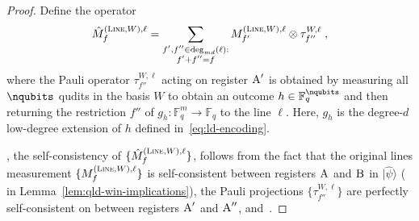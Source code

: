 \documentclass[11pt]{article}
\theoremstyle{definition}
\newcommand{\ket}[1]{|#1\rangle}
\newcommand{\F}{\ensuremath{\mathbb{F}}}
\newcommand{\labelstyle}[1]{\ensuremath{\textsc{#1}}\xspace}
\newcommand{\alice}{\labelstyle{A}}
\newcommand{\bob}{\labelstyle{B}}
\newcommand{\typestyle}[1]{\ensuremath{\textsc{#1}}\xspace}
\renewcommand{\line}{\mathbf{\ell}}
\newcommand{\Line}{\typestyle{Line}}
\begin{document}
\begin{proof}
	Define the operator
	\[
		\hat{M}^{(\Line,W),\line}_f = \sum_{\substack{f',f'' \in \deg_{md}(\line) : \\ f' + f'' = f}} M^{(\Line,W),\line}_{f'} \otimes \tau^{W,\line}_{f''}\;,
	\]
	where the Pauli operator $\tau^{W,\line}_{f''}$ acting on register $\alice'$ is obtained by measuring all $\nqubits$ qudits in the basis $W$ to obtain an outcome $h \in \F_q^\nqubits$ and then returning the restriction $f''$ of $g_h: \F_q^m \to \F_q$ to the line $\line$. Here, $g_h$ is the degree-$d$ low-degree extension of $h$ defined in~\eqref{eq:ld-encoding}. 
	
	,	the self-consistency of $\{\hat{M}^{(\Line,W),\line}_f \}$, follows from the fact that the original lines measurement $\{ M^{(\Line,W),\line}_f \}$ is self-consistent between registers $\alice$ and $\bob$ in $\ket{\hat{\psi}}$ ( in Lemma~\ref{lem:qld-win-implications}), the Pauli projections $\{\tau^{W,\line}_{f''}\}$ are perfectly self-consistent on between registers $\alice'$ and $\alice''$, and~. 


\end{proof}
\end{document}
